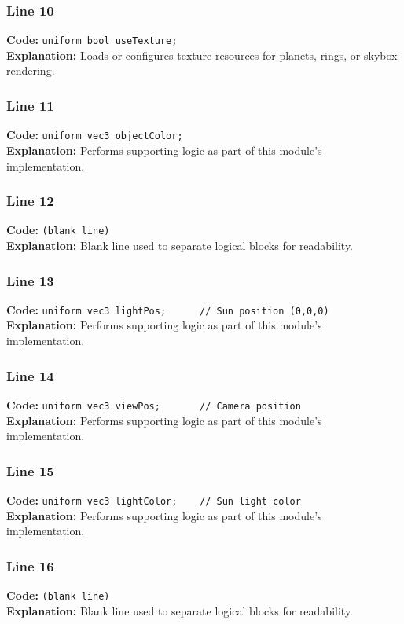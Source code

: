 \documentclass[11pt,a4paper]{article}
\begin{document}
\subsubsection*{Line 10}
\textbf{Code:} \verb|uniform bool useTexture;|\\
\textbf{Explanation:} Loads or configures texture resources for planets, rings, or skybox rendering.

\subsubsection*{Line 11}
\textbf{Code:} \verb|uniform vec3 objectColor;|\\
\textbf{Explanation:} Performs supporting logic as part of this module's implementation.

\subsubsection*{Line 12}
\textbf{Code:} \texttt{(blank line)}\\
\textbf{Explanation:} Blank line used to separate logical blocks for readability.

\subsubsection*{Line 13}
\textbf{Code:} \verb|uniform vec3 lightPos;      // Sun position (0,0,0)|\\
\textbf{Explanation:} Performs supporting logic as part of this module's implementation.

\subsubsection*{Line 14}
\textbf{Code:} \verb|uniform vec3 viewPos;       // Camera position|\\
\textbf{Explanation:} Performs supporting logic as part of this module's implementation.

\subsubsection*{Line 15}
\textbf{Code:} \verb|uniform vec3 lightColor;    // Sun light color|\\
\textbf{Explanation:} Performs supporting logic as part of this module's implementation.

\subsubsection*{Line 16}
\textbf{Code:} \texttt{(blank line)}\\
\textbf{Explanation:} Blank line used to separate logical blocks for readability.
\end{document}
